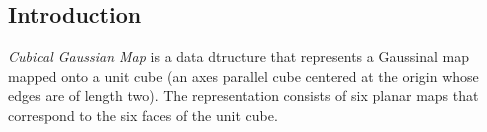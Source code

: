 
\subsection*{Introduction}

{\em Cubical Gaussian Map} is a data dtructure that represents a Gaussinal map
mapped onto a unit cube (an axes parallel cube centered at the origin whose
edges are of length two). The representation consists of six planar maps that
correspond to the six faces of the unit cube.
